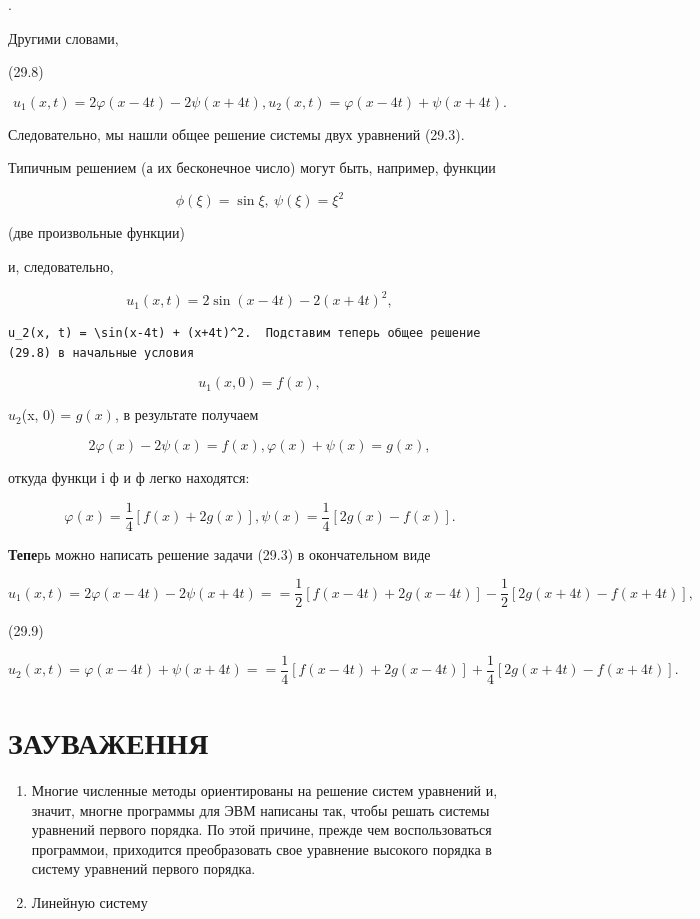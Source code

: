 \documentclass[
  ukrainian,
]{article}
\begin{document}
.

Другими словами,

(29.8)

\[
u_1(x, t) = 2\varphi(x-4t) - 2\psi(x+4t), u_2(x, t) = \varphi(x-4t) + \psi(x+4t).
\]

Следовательно, мы нашли общее решение системы двух уравнений (29.3).

Типичным решением (а их бесконечное число) могут быть, например, функции

\[
\phi(\xi) = \sin \xi, \ \psi(\xi) = \xi^2
\]

(две произвольные функции)

и, следовательно,

\[
u_1(x, t) = 2 \sin(x-4t) - 2(x+4t)^2,
\]

\begin{verbatim}
u_2(x, t) = \sin(x-4t) + (x+4t)^2.  Подставим теперь общее решение (29.8) в начальные условия
\end{verbatim}

\[
u_1(x, 0) = f(x),
\]

\(u_2\)(x, 0) = \(g(x)\), в результате получаем

\[
2\varphi(x) - 2\psi(x) = f(x),
\varphi(x) + \psi(x) = g(x),
\]

откуда функци і ф и ф легко находятся:

\[
\varphi(x) = \frac{1}{4} \left[ f(x) + 2g(x) \right],
\psi(x) = \frac{1}{4} \left[ 2g(x) - f(x) \right].
\]

\textbf{Тепе}рь можно написать решение задачи (29.3) в окончательном
виде

\[
u_{1}(x, t) = 2\varphi(x-4t) - 2\psi(x+4t) =
= \frac{1}{2} \left[ f(x-4t) + 2g(x-4t) \right] - \frac{1}{2} \left[ 2g(x+4t) - f(x+4t) \right],
\]

(29.9)

\[
u_{2}(x, t) = \varphi(x-4t) + \psi(x+4t) =
= \frac{1}{4} \left[ f(x-4t) + 2g(x-4t) \right] + \frac{1}{4} \left[ 2g(x+4t) - f(x+4t) \right].
\]

\section{ЗАУВАЖЕННЯ}\label{ux437ux430ux443ux432ux430ux436ux435ux43dux43dux44f-1}

\begin{enumerate}
\def\labelenumi{\arabic{enumi}.}
\item
  Многие численные методы ориентированы на решение систем уравнений и,
  значит, многне программы для ЭВМ написаны так, чтобы решать системы
  уравнений первого порядка. По этой причине, прежде чем воспользоваться
  программои, приходится преобразовать свое уравнение высокого порядка в
  систему уравнений первого порядка.
\item
  Линейную систему
\end{enumerate}
\end{document}
